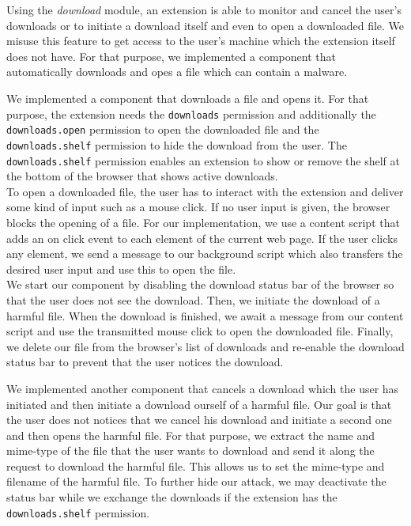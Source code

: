 	Using the \textit{download} module, an extension is able to monitor and cancel the user's downloads or to initiate a download itself and even to open a downloaded file. We misuse this feature to get access to the user's machine which the extension itself does not have. For that purpose, we implemented a component that automatically downloads and opes a file which can contain a malware.
	
	We implemented a component that downloads a file and opens it. For that purpose, the extension needs the \texttt{downloads} permission and additionally the \texttt{downloads.open} permission to open the downloaded file and the \texttt{downloads.shelf} permission to hide the download from the user. The \texttt{downloads.shelf} permission enables an extension to show or remove the shelf at the bottom of the browser that shows active downloads. \\
	To open a downloaded file, the user has to interact with the extension and deliver some kind of input such as a mouse click. If no user input is given, the browser blocks the opening of a file. For our implementation, we use a content script that adds an on click event to each element of the current web page. If the user clicks any element, we send a message to our background script which also transfers the desired user input and use this to open the file. \\
	We start our component by disabling the download status bar of the browser so that the user does not see the download. Then, we initiate the download of a harmful file. When the download is finished, we await a message from our content script and use the transmitted mouse click to open the downloaded file. Finally, we delete our file from the browser's list of downloads and re-enable the download status bar to prevent that the user notices the download.
	
	We implemented another component that cancels a download which the user has initiated and then initiate a download ourself of a harmful file. Our goal is that the user does not notices that we cancel his download and initiate a second one and then opens the harmful file. For that purpose, we extract the name and mime-type of the file that the user wants to download and send it along the request to download the harmful file. This allows us to set the mime-type and filename of the harmful file. To further hide our attack, we may deactivate the status bar while we exchange the downloads if the extension has the \texttt{downloads.shelf} permission. \\

